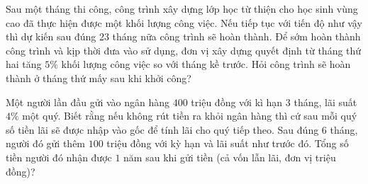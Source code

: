 \begin{ex}%
	Sau một tháng thi công, công trình xây dựng lớp học từ thiện cho học sinh vùng cao đã thực hiện được một khối lượng công việc. Nếu tiếp tục với tiến độ như  vậy thì dự kiến sau đúng 23 tháng nữa công trình sẽ hoàn thành. Để sớm hoàn thành công trình và kịp thời đưa vào sử dụng, đơn vị xây dựng quyết định từ tháng thứ hai tăng $5\%$ khối lượng công việc so với tháng kề trước. Hỏi công trình sẽ hoàn thành ở tháng thứ mấy sau khi khởi công?
\end{ex}

\begin{ex}%
	Một người lần đầu gửi vào ngân hàng $400$ triệu đồng với kì hạn $3$ tháng, lãi suất $4 \%$ một quý. Biết rằng  nếu không rút tiền ra khỏi ngân hàng thì cứ sau mỗi quý số tiền lãi sẽ được nhập vào gốc để tính lãi cho quý tiếp theo. Sau đúng $6$ tháng, người đó gửi thêm $100$ triệu đồng với kỳ hạn và lãi suất như trước đó. Tổng số tiền người đó nhận được $1$ năm sau khi gửi tiền (cả vốn lẫn lãi, đơn vị triệu đồng)?
\end{ex}

